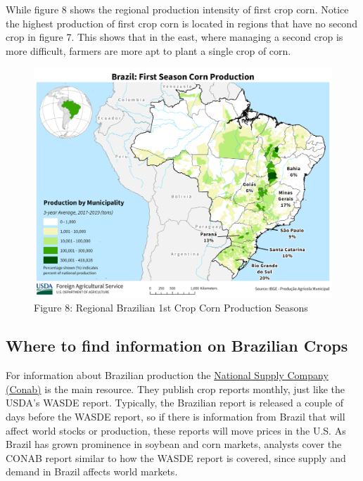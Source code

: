 \documentclass[
  letterpaper,
  DIV=11,
  numbers=noendperiod]{scrreprt}
\begin{document}
While figure 8 shows the regional production intensity of first crop
corn. Notice the highest production of first crop corn is located in
regions that have no second crop in figure 7. This shows that in the
east, where managing a second crop is more difficult, farmers are more
apt to plant a single crop of corn.

\begin{figure}[H]

{\centering \includegraphics{assets/Brazil_FirstSeason_Corn.png}

}

\caption{Figure 8: Regional Brazilian 1st Crop Corn Production Seasons}

\end{figure}%

\subsection{Where to find information on Brazilian
Crops}\label{where-to-find-information-on-brazilian-crops}

For information about Brazilian production the
\href{http://www.conab.gov.br/index.php}{National Supply Company
(Conab)} is the main resource. They publish crop reports monthly, just
like the USDA's WASDE report. Typically, the Brazilian report is
released a couple of days before the WASDE report, so if there is
information from Brazil that will affect world stocks or production,
these reports will move prices in the U.S. As Brazil has grown
prominence in soybean and corn markets, analysts cover the CONAB report
similar to how the WASDE report is covered, since supply and demand in
Brazil affects world markets.
\end{document}
